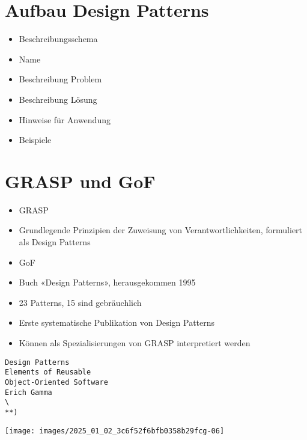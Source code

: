 \documentclass[10pt]{article}
\begin{document}
\section*{Aufbau Design Patterns}
\begin{itemize}
  \item Beschreibungsschema
  \item Name
  \item Beschreibung Problem
  \item Beschreibung Lösung
  \item Hinweise für Anwendung
  \item Beispiele
\end{itemize}

\section*{GRASP und GoF}
\begin{itemize}
  \item GRASP
  \item Grundlegende Prinzipien der Zuweisung von Verantwortlichkeiten, formuliert als Design Patterns
  \item GoF
  \item Buch «Design Patterns», herausgekommen 1995
  \item 23 Patterns, 15 sind gebräuchlich
  \item Erste systematische Publikation von Design Patterns
  \item Können als Spezialisierungen von GRASP interpretiert werden
\end{itemize}

\begin{verbatim}
Design Patterns
Elements of Reusable
Object-Oriented Software
Erich Gamma
\
**)
\end{verbatim}

\begin{center}
\texttt{[image: images/2025\_01\_02\_3c6f52f6bfb0358b29fcg-06]}
\end{center}
\end{document}
